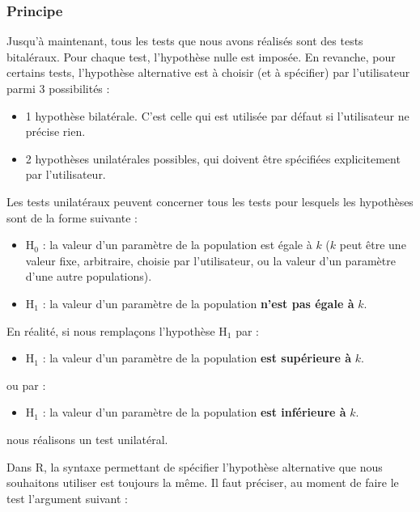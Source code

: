 \documentclass[a4paperpaper,]{article}
\providecommand{\tightlist}{%
  \setlength{\itemsep}{0pt}\setlength{\parskip}{0pt}}
\begin{document}
\hypertarget{principe}{%
\subsubsection{Principe}\label{principe}}

Jusqu'à maintenant, tous les tests que nous avons réalisés sont des tests bitaléraux. Pour chaque test, l'hypothèse nulle est imposée. En revanche, pour certains tests, l'hypothèse alternative est à choisir (et à spécifier) par l'utilisateur parmi 3 possibilités :

\begin{itemize}
\tightlist
\item
  1 hypothèse bilatérale. C'est celle qui est utilisée par défaut si l'utilisateur ne précise rien.
\item
  2 hypothèses unilatérales possibles, qui doivent être spécifiées explicitement par l'utilisateur.
\end{itemize}

Les tests unilatéraux peuvent concerner tous les tests pour lesquels les hypothèses sont de la forme suivante :

\begin{itemize}
\tightlist
\item
  H\(_0\) : la valeur d'un paramètre de la population est égale à \(k\) (\(k\) peut être une valeur fixe, arbitraire, choisie par l'utilisateur, ou la valeur d'un paramètre d'une autre populations).
\item
  H\(_1\) : la valeur d'un paramètre de la population \textbf{n'est pas égale à} \(k\).
\end{itemize}

En réalité, si nous remplaçons l'hypothèse H\(_1\) par :

\begin{itemize}
\tightlist
\item
  H\(_1\) : la valeur d'un paramètre de la population \textbf{est supérieure à} \(k\).
\end{itemize}

ou par :

\begin{itemize}
\tightlist
\item
  H\(_1\) : la valeur d'un paramètre de la population \textbf{est inférieure à} \(k\).
\end{itemize}

nous réalisons un test unilatéral.

Dans R, la syntaxe permettant de spécifier l'hypothèse alternative que nous souhaitons utiliser est toujours la même. Il faut préciser, au moment de faire le test l'argument suivant :
\end{document}
